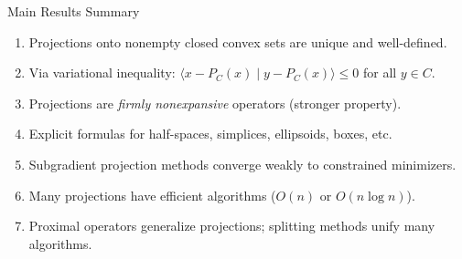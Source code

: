 \documentclass[aspectratio=169,10pt]{beamer}
\begin{document}
\begin{frame}{Main Results Summary}

    \begin{enumerate}
        \item[\textbf{Existence \& Uniqueness}]
        Projections onto nonempty closed convex sets are unique and well-defined.

        \vspace{0.2cm}

        \item[\textbf{Characterization}]
        Via variational inequality: $\langle x - P_C(x) \mid y - P_C(x) \rangle \leq 0$ for all $y \in C$.

        \vspace{0.2cm}

        \item[\textbf{Nonexpansiveness}]
        Projections are \textit{firmly nonexpansive} operators (stronger property).

        \vspace{0.2cm}

        \item[\textbf{Special Cases}]
        Explicit formulas for half-spaces, simplices, ellipsoids, boxes, etc.

        \vspace{0.2cm}

        \item[\textbf{Algorithms}]
        Subgradient projection methods converge weakly to constrained minimizers.

        \vspace{0.2cm}

        \item[\textbf{Computational}]
        Many projections have efficient algorithms ($O(n)$ or $O(n\log n)$).

        \vspace{0.2cm}

        \item[\textbf{Connections}]
        Proximal operators generalize projections; splitting methods unify many algorithms.
    \end{enumerate}

\end{frame}
\end{document}

